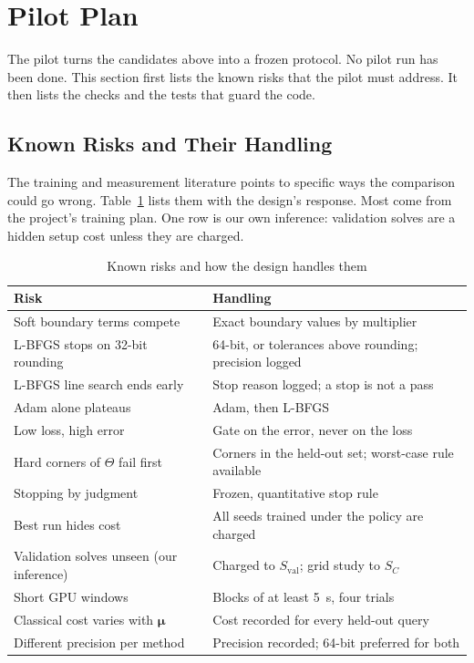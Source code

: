 \documentclass[journal]{IEEEtran}
\begin{document}
\section{Pilot Plan}\label{sec:pilot}

The pilot turns the candidates above into a frozen protocol. No pilot run has been done. This section first lists the known risks that the pilot must address. It then lists the checks and the tests that guard the code.

\subsection{Known Risks and Their Handling}
The training and measurement literature points to specific ways the comparison could go wrong. Table~\ref{tab:risks} lists them with the design's response. Most come from the project's training plan. One row is our own inference: validation solves are a hidden setup cost unless they are charged.

\begin{table}[t]
\caption{Known risks and how the design handles them}
\label{tab:risks}
\centering
\footnotesize
\setlength{\tabcolsep}{2.5pt}
\begin{tabular}{@{}p{2.9cm}p{5.2cm}@{}}
\toprule
Risk & Handling \\
\midrule
Soft boundary terms compete~\cite{wang2021gradient,wang2022ntk} & Exact boundary values by multiplier \\
L-BFGS stops on 32-bit rounding~\cite{xu2025} & 64-bit, or tolerances above rounding; precision logged \\
L-BFGS line search ends early~\cite{rathore2024} & Stop reason logged; a stop is not a pass \\
Adam alone plateaus~\cite{markidis2021,rathore2024} & Adam, then L-BFGS \\
Low loss, high error~\cite{rathore2024} & Gate on the error, never on the loss \\
Hard corners of $\Theta$ fail first~\cite{deryck2024,krishnapriyan2021} & Corners in the held-out set; worst-case rule available \\
Stopping by judgment~\cite{chuang2022} & Frozen, quantitative stop rule \\
Best run hides cost~\cite{mishra2022,mcgreivy2024} & All seeds trained under the policy are charged \\
Validation solves unseen (our inference) & Charged to $S_{\mathrm{val}}$; grid study to $S_C$ \\
Short GPU windows~\cite{yang2024} & Blocks of at least 5~s, four trials \\
Classical cost varies with $\boldsymbol{\mu}$~\cite{zhang2026} & Cost recorded for every held-out query \\
Different precision per method~\cite{chuang2022} & Precision recorded; 64-bit preferred for both \\
\bottomrule
\end{tabular}
\end{table}
\end{document}
